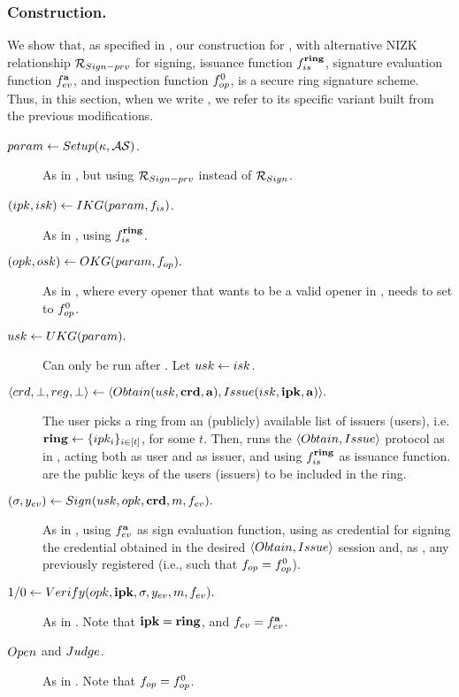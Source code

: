 \subsubsection{\CUASRing Construction.} %
We show that, as specified in , our \CUASGen construction
for \UAS, with alternative NIZK relationship $\mathcal{R}_{Sign-prv}$ for signing,
issuance function $f_{is}^{\mathbf{ring}}$, signature evaluation function
$f_{ev}^{\mathbf{a}}$, and inspection function $f_{op}^0$, is a secure ring
signature scheme. Thus, in this section, when we write \CUASGen, we refer to
its specific variant built from the previous modifications.

\begin{description}  
\item[$param \gets Setup(\kappa,\mathcal{AS})$.] As in \CUASGen, but using
  $\mathcal{R}_{Sign-prv}$ instead of $\mathcal{R}_{Sign}$.  
\item[$(ipk,isk) \gets IKG(param,f_{is})$.] As in \CUASGen, using
  $f_{is}^{\mathbf{ring}}$.  
\item[$(opk,osk) \gets OKG(param,f_{op}).$] As in \CUASGen, where every
  opener that wants to be a valid opener in \CUASRing, needs to set \finsp to
  $f_{op}^0$.  
\item[$usk \gets UKG(param).$] Can only be run after \IKeyGen. Let 
  $usk \gets isk$.
\item[$\langle crd,\bot,reg,\bot \rangle \gets
  \langle Obtain(usk,\mathbf{crd},\mathbf{a}),Issue(isk,\mathbf{ipk},\mathbf{a})\rangle.$]
  The user picks a ring from an (publicly) available list of issuers (users),
  i.e. $\mathbf{ring} \gets \lbrace ipk_i \rbrace_{i \in [t]}$, for some $t$. Then,
  runs the $\langle Obtain,Issue \rangle$ protocol as in \CUASGen, acting both
  as user and as issuer, and using $f_{is}^{\mathbf{ring}}$ as issuance function.
  \attrs are the public keys of the users (issuers) to be included in the ring.
\item[$(\sigma,y_{ev}) \gets Sign(usk,opk,\mathbf{crd},m,f_{ev}).$] As in
  \CUASGen, using $f_{ev}^{\mathbf{a}}$ as sign evaluation function, using
  as credential for signing the credential obtained in the desired $\langle
  Obtain,Issue \rangle$ session and, as \opk, any previously registered \opk
  (i.e., such that $f_{op}=f_{op}^0$).
\item[$1/0 \gets Verify(opk,\mathbf{ipk},\sigma,y_{ev},m,f_{ev}).$] As in \CUASGen.
  Note that $\mathbf{ipk} = \mathbf{ring}$, and $f_{ev}=f_{ev}^{\mathbf{a}}$.
\item[$Open$ and $Judge$.] As in \CUASGen. Note that $f_{op}=f_{op}^0$.
\end{description}

